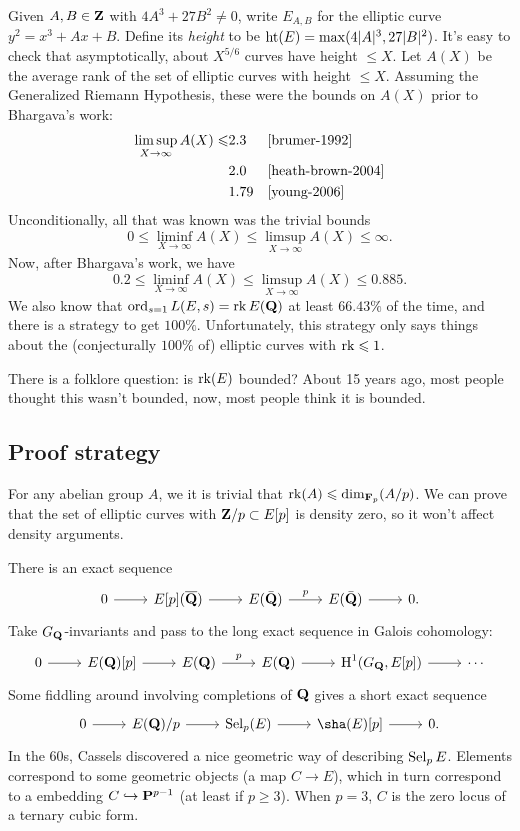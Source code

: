 Given $A,B\in \mathbf{Z}$ with $4 A^3+27 B^2\ne 0$, write $E_{A,B}$ for the elliptic 
curve $y^2=x^3+A x+B$. Define its \emph{height} to be 
$\operatorname{ht}(E)=\max(4 |A|^3,27 |B|^2)$. It's easy to check that asymptotically, 
about $X^{5/6}$ curves have height $\leqslant X$. Let $A(X)$ be the average 
rank of the set of elliptic curves with height $\leqslant X$. Assuming the 
Generalized Riemann  Hypothesis, these were the bounds on $A(X)$ prior to 
Bhargava's work: 
\begin{align*}
  \limsup_{X\to \infty}  A(X) \leqslant 
    & 2.3 && \text{\cite{brumer-1992}} \\
    & 2.0 && \text{\cite{heath-brown-2004}} \\
    & 1.79 && \text{\cite{young-2006}}
\end{align*}
Unconditionally, all that was known was the trivial bounds
\[
  0\leqslant \liminf_{X\to \infty} A(X) \leqslant \limsup_{X\to \infty} A(X) \leqslant \infty .
\]
Now, after Bhargava's work, we have
\[
  0.2 \leqslant \liminf_{X\to \infty} A(X) \leqslant \limsup_{X\to \infty} A(X) \leqslant 0.885 .
\]
We also know that $\operatorname{ord}_{s=1} L(E,s) = \operatorname{rk} E(\mathbf{Q})$ at least 
$66.43\%$ of the time, and there is a strategy to get $100\%$. Unfortunately, 
this strategy only says things about the (conjecturally $100\%$ of) elliptic 
curves with $\operatorname{rk}\leqslant 1$. 

There is a folklore question: is $\operatorname{rk}(E)$ bounded? About 15 years ago, most 
people thought this wasn't bounded, now, most people think it is bounded. 





\subsection{Proof strategy}

For any abelian group $A$, we it is trivial that
$\operatorname{rk}(A)\leqslant \dim_{\mathbf{F}_p}(A/p)$. We can prove that the set of elliptic 
curves with $\mathbf{Z}/p\subset E[p]$ is density zero, so it won't affect density 
arguments. 

There is an exact sequence 
\[\begin{tikzcd}
  0 \ar[r] 
    & E[p](\overline\dQ) \ar[r] 
    & E(\bar\dQ) \ar[r, "p"]
    & E(\bar\dQ) \ar[r] 
    & 0 .
\end{tikzcd}\]
Take $G_{\mathbf{Q}}$-invariants and pass to the long exact sequence in Galois 
cohomology: 
\[\begin{tikzcd}
  0 \ar[r] 
    & E(\dQ)[p] \ar[r] 
    & E(\dQ) \ar[r, "p"] 
    & E(\dQ) \ar[r] 
    & \h^1(G_\dQ,E[p]) \ar[r] 
    & \cdots
\end{tikzcd}\]
Some fiddling around involving completions of $\mathbf{Q}$ gives a short exact sequence 
\[\begin{tikzcd}
  0 \ar[r] 
    & E(\dQ)/p \ar[r] 
    & \selmer_p(E) \ar[r] 
    & \sha(E)[p] \ar[r]
    & 0 .
\end{tikzcd}\]
In the 60s, Cassels discovered a nice geometric way of describing $\operatorname{Sel}_p E$. 
Elements correspond to some geometric objects (a map $C\to E$), which in turn 
correspond to a embedding $C\hookrightarrow \mathbf{P}^{p-1}$ (at least if 
$p\geqslant 3$). When $p=3$, $C$ is the zero locus of a ternary cubic form. 

